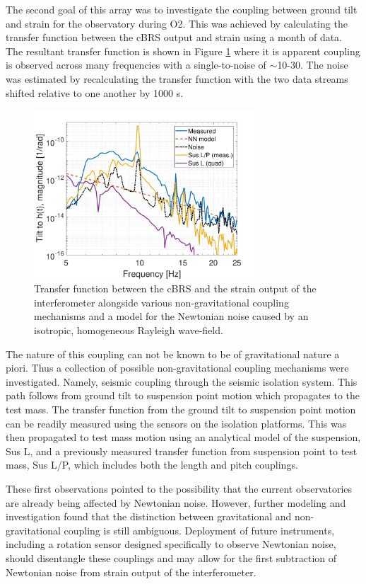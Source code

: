 \documentclass [12pt, proquest]{uwthesis}[2019]
\begin{document}
The second goal of this array was to investigate the coupling between ground tilt and strain for the observatory during O2. This was achieved by calculating the transfer function between the cBRS output and strain using a month of data. The resultant transfer function is shown in Figure \ref{NNCoupling} where it is apparent coupling is observed across many frequencies with a single-to-noise of $\sim$10-30. The noise was estimated by recalculating the transfer function with the two data streams shifted relative to one another by 1000 s. 

\begin{figure}[!h]
\begin{center}
\includegraphics[width=0.75\textwidth]{NNCoupling.pdf}
\end{center}
\caption[Transfer function between the cBRS and the strain output of the interferometer]{Transfer function between the cBRS and the strain output of the interferometer alongside various non-gravitational coupling mechanisms and a model for the Newtonian noise caused by an isotropic, homogeneous Rayleigh wave-field.}
\label{NNCoupling}
\end{figure}

The nature of this coupling can not be known to be of gravitational nature a piori. Thus a collection of possible non-gravitational coupling mechanisms were investigated. \cite{NN} Namely, seismic coupling through the seismic isolation system. This path follows from ground tilt to suspension point motion which propagates to the test mass. The transfer function from the ground tilt to suspension point motion can be readily measured using the sensors on the isolation platforms. This was then propagated to test mass motion using an analytical model of the suspension, Sus L, and a previously measured transfer function from suspension point to test mass, Sus L/P, which includes both the length and pitch couplings.

These first observations pointed to the possibility that the current observatories are already being affected by Newtonian noise. However, further modeling and investigation \cite{NN2} found that the distinction between gravitational and non-gravitational coupling is still ambiguous. Deployment of future instruments, including a rotation sensor designed specifically to observe Newtonian noise, should disentangle these couplings and may allow for the first subtraction of Newtonian noise from strain output of the interferometer.

\printendnotes
\nocite{*}   


\end{document}
